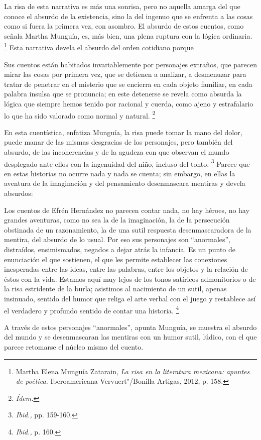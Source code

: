 \documentclass[14pt,twoside,final]{extbook} %
\let\oldfootnote\footnote
\renewcommand\footnote[1]{%
\oldfootnote{\hspace{1mm}#1}}
\begin{document}
La risa de esta narrativa es más una sonrisa, pero no aquella amarga del que conoce el absurdo de la existencia, sino la del ingenuo que se enfrenta a las cosas como si fuera la primera vez, con asombro. El absurdo de estos cuentos, como señala Martha Munguía, es, más bien, una plena ruptura con la lógica ordinaria.\footnote{Martha Elena Munguía Zatarain, \emph{La risa en la literatura mexicana: apuntes de poética.} Iberoamericana Vervuert"/Bonilla Artigas, 2012, p. 158.} Esta narrativa devela el absurdo del orden cotidiano porque
\begin{quoting}
Sus cuentos están habitados invariablemente por personajes extraños, que parecen mirar las cosas por primera vez, que se detienen a analizar, a desmenuzar para tratar de penetrar en el misterio que se encierra en cada objeto familiar, en cada palabra insulsa que se pronuncia; en este detenerse se revela como absurda la lógica que siempre hemos tenido por racional y cuerda, como ajeno y estrafalario lo que ha sido valorado como normal y natural.\footnote{\em Ídem.}
\end{quoting}
En esta cuentística, enfatiza Munguía, la risa puede tomar la mano del dolor, puede manar de las mismas desgracias de los personajes, pero también del absurdo, de las incoherencias y de la agudeza con que observan el mundo desplegado ante ellos con la ingenuidad del niño, incluso del tonto.\footnote{\emph{Ibid.,} pp. 159-160.} Parece que en estas historias no ocurre nada y nada se cuenta; sin embargo, en ellas la aventura de la imaginación y del pensamiento desenmascara mentiras y devela absurdos:
\begin{quoting}
Los cuentos de Efrén Hernández no parecen contar nada, no hay héroes, no hay grandes aventuras, como no sea la de la imaginación, la de la persecución obstinada de un razonamiento, la de una sutil respuesta desenmascaradora de la mentira, del absurdo de lo usual. Por eso sus personajes son ``anormales'', distraídos, ensimismados, negados a dejar atrás la infancia. Es un punto de enunciación el que sostienen, el que les permite establecer las conexiones inesperadas entre las ideas, entre las palabras, entre los objetos y la relación de éstos con la vida. Estamos aquí muy lejos de los tonos satíricos admonitorios o de la risa estridente de la burla; asistimos al nacimiento de un sutil, apenas insinuado, sentido del humor que religa el arte verbal con el juego y restablece así el verdadero y profundo sentido de contar una historia.\footnote{\emph{Ibid.,} p. 160.}
\end{quoting}
A través de estos personajes ``anormales'', apunta Munguía, se muestra el absurdo del mundo y se desenmascaran las mentiras con un humor sutil, lúdico, con el que parece retomarse el núcleo mismo del cuento.
\end{document}
